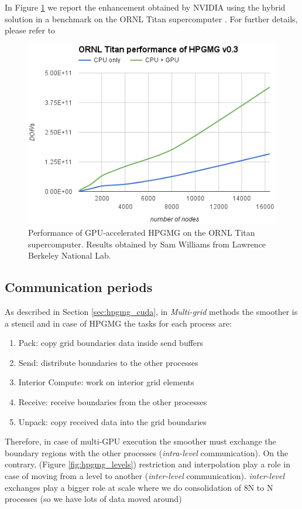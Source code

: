 \documentclass[conference]{IEEEtran}
\begin{document}
In Figure \ref{fig:hpgmg_ornl_bench} we report the enhancement obtained by NVIDIA using the hybrid solution in a benchmark on the ORNL Titan supercomputer \cite{ornl}. For further details, please refer to \cite{HPGMG_NVIDIA}

\begin{figure}[h]
\includegraphics[scale=0.7]{hpgmg_ornl_titan_perf_cuda.png}
\caption{Performance of GPU-accelerated HPGMG on the ORNL Titan supercomputer. Results obtained by Sam Williams from Lawrence Berkeley National Lab.}
\label{fig:hpgmg_ornl_bench}
\end{figure}


\subsection{Communication periods}\label{sec:hpgmg_cuda_communications}

As described in Section \ref{sec:hpgmg_cuda}, in \emph{Multi-grid} methods the smoother is a stencil and in case of HPGMG the tasks for each process are:
\begin{enumerate}
\item Pack: copy grid boundaries data inside send buffers
\item Send: distribute boundaries to the other processes
\item Interior Compute: work on interior grid elements
\item Receive: receive boundaries from the other processes
\item Unpack: copy received data into the grid boundaries
\end{enumerate}

Therefore, in case of multi-GPU execution the smoother must exchange the boundary regions with the other processes (\emph{intra-level} communication). 
On the contrary, (Figure \ref{fig:hpgmg_levels}) restriction and interpolation play a role in case of moving from a level to another (\emph{inter-level} communication).
\emph{inter-level} exchanges play a bigger role at scale where we do consolidation of 8N to N processes (so we have lots of data moved around)
\end{document}
